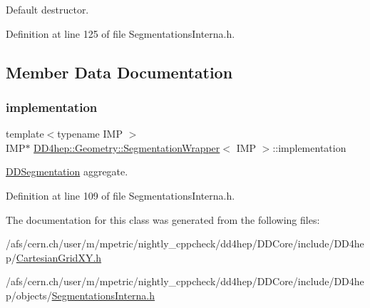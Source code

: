 Default destructor. 



Definition at line 125 of file Segmentations\+Interna.\+h.



\subsection{Member Data Documentation}
\hypertarget{class_d_d4hep_1_1_geometry_1_1_segmentation_wrapper_a1f5c880ae30f25a0dd16cfd963aea926}{}\label{class_d_d4hep_1_1_geometry_1_1_segmentation_wrapper_a1f5c880ae30f25a0dd16cfd963aea926} 
\subsubsection{\texorpdfstring{implementation}{implementation}}
{\footnotesize\ttfamily template$<$typename I\+MP $>$ \\
I\+MP$\ast$ \hyperlink{class_d_d4hep_1_1_geometry_1_1_segmentation_wrapper}{D\+D4hep\+::\+Geometry\+::\+Segmentation\+Wrapper}$<$ I\+MP $>$\+::implementation}



\hyperlink{namespace_d_d4hep_1_1_d_d_segmentation}{D\+D\+Segmentation} aggregate. 



Definition at line 109 of file Segmentations\+Interna.\+h.



The documentation for this class was generated from the following files\+:\begin{DoxyCompactItemize}
\item 
/afs/cern.\+ch/user/m/mpetric/nightly\+\_\+cppcheck/dd4hep/\+D\+D\+Core/include/\+D\+D4hep/\hyperlink{_d_d_core_2include_2_d_d4hep_2_cartesian_grid_x_y_8h}{Cartesian\+Grid\+X\+Y.\+h}\item 
/afs/cern.\+ch/user/m/mpetric/nightly\+\_\+cppcheck/dd4hep/\+D\+D\+Core/include/\+D\+D4hep/objects/\hyperlink{_segmentations_interna_8h}{Segmentations\+Interna.\+h}\end{DoxyCompactItemize}
